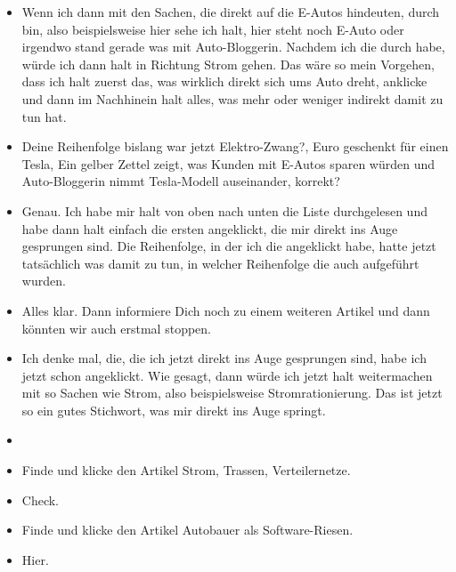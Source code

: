 {\begin{itemize}[]
                  Und deswegen würde ich jetzt nicht nach irgendwelchen speziellen Themen Ausschau halten, sondern einfach alles, was damit zu tun hat.
            \item {} Wenn ich dann mit den Sachen, die direkt auf die E-Autos hindeuten, durch bin, also beispielsweise hier sehe ich halt, hier steht noch E-Auto oder irgendwo stand gerade was mit Auto-Bloggerin.
                  Nachdem ich die durch habe, würde ich dann halt in Richtung Strom gehen.
                  Das wäre so mein Vorgehen, dass ich halt zuerst das, was wirklich direkt sich ums Auto dreht, anklicke und dann im Nachhinein halt alles, was mehr oder weniger indirekt damit zu tun hat.
            \item {} Deine Reihenfolge bislang war jetzt \flqq Elektro-Zwang?\frqq{},  Euro geschenkt für einen Tesla\frqq{}, \flqq Ein gelber Zettel zeigt, was Kunden mit E-Autos sparen würden\frqq{} und \flqq Auto-Bloggerin nimmt Tesla-Modell auseinander\frqq{}, korrekt?
            \item {} Genau.
                  Ich habe mir halt von oben nach unten die Liste durchgelesen und habe dann halt einfach die ersten angeklickt, die mir direkt ins Auge gesprungen sind.
                  Die Reihenfolge, in der ich die angeklickt habe, hatte jetzt tatsächlich was damit zu tun, in welcher Reihenfolge die auch aufgeführt wurden.
            \item {} Alles klar. Dann informiere Dich noch zu einem weiteren Artikel und dann könnten wir auch erstmal stoppen.
            \item {} Ich denke mal, die, die ich jetzt direkt ins Auge gesprungen sind, habe ich jetzt schon angeklickt.
                  Wie gesagt, dann würde ich jetzt halt weitermachen mit so Sachen wie Strom, also beispielsweise \flqq Stromrationierung\frqq{}.
                  Das ist jetzt so ein gutes Stichwort, was mir direkt ins Auge springt.
            \item {}
            \item {} Finde und klicke den Artikel \flqq Strom, Trassen, Verteilernetze\frqq{}.
            \item {} Check.
            \item {} Finde und klicke den Artikel \flqq Autobauer als Software-Riesen\frqq{}.
            \item {} Hier.

\end{itemize}}
